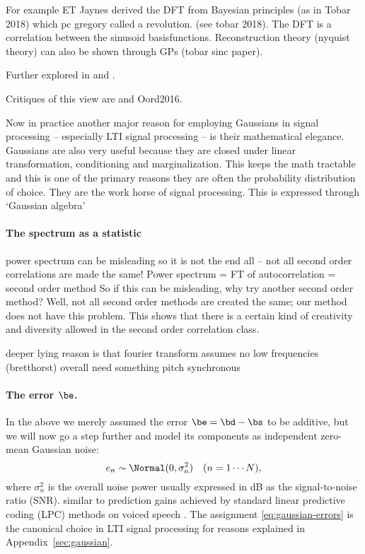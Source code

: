 \begin{chapterappendices}{5}
For example ET Jaynes derived the DFT from Bayesian principles (as in Tobar 2018) which pc gregory called a revolution. (see tobar 2018).
The DFT is a correlation between the sinusoid basisfunctions.
Reconstruction theory (nyquist theory) can also be shown through GPs (tobar sinc paper).

Further explored in \citep{Tobar2018} and \citep{Turner2014}.

Critiques of this view are \citep{Little2011} and Oord2016.

Now in practice another major reason for employing Gaussians in signal processing -- especially LTI signal processing -- is their mathematical elegance.
Gaussians are also very useful because they are closed under linear transformation, conditioning and marginalization.
This keeps the math tractable and this is one of the primary reasons they are often the probability distribution of choice.
They are the work horse of signal processing.
This is expressed through `Gaussian algebra' \citep[Ch.~3]{Hennig2022}

\paragraph{The spectrum as a statistic}
power spectrum can be misleading so it is not the end all -- not all second order correlations are made the same!
Power spectrum = FT of autocorrelation = second order method
So if this can be misleading, why try another second order method?
Well, not all second order methods are created the same; our method does not have this problem.
This shows that there is a certain kind of creativity and diversity allowed in the second order correlation class.

\citep{Fulop2011} %
deeper lying reason is that fourier transform assumes no low frequencies (bretthorst)
overall need something pitch synchronous


\paragraph{The error $\be$.}
In the above we merely assumed the error $\be = \bd - \bs$ to be additive, but we will now go a step further and model its components as independent zero-mean Gaussian noise:
\begin{equation}
	e_n  \sim \Normal(0, \sigma_n^2) \quad (n = 1 \cdots N), \label{eq:gaussian-errors}
\end{equation}
where $\sigma_n^2$ is the overall noise power usually expressed in dB as the signal-to-noise ratio (SNR).
 similar to prediction gains achieved by standard linear predictive coding (LPC) methods on voiced speech \citep{Schroeder1999}.
The assignment \eqref{eq:gaussian-errors} is the canonical choice in LTI signal processing \citep{Little2011} for reasons explained in Appendix~\ref{sec:gaussian}.


\end{chapterappendices}
